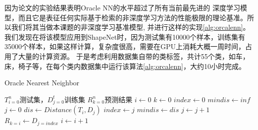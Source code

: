 \documentclass[bachelor, nocolorlinks, printoneside]{seuthesis} %
\begin{document}
\begin{Main}
因为论文\cite{tatarchenko2019single}的实验结果表明Oracle NN的水平超过了所有当前最先进的
深度学习模型，而且它是表征任何实际基于检索的非深度学习方法的性能极限的理论基准。所以我们将其当做本课题的非深度学习基准模型, 并进行这样的实现\ref{alg:orcalenn}。
我们发现在将该模型应用到ShapeNet时，因为测试集有10000个样本，训练集有35000个样本，如果这样计算，复杂度很高，需要在GPU上消耗大概一周时间，占用了大量的计算资源。
于是考虑利用数据集自带的类标签，共计55个类，如车，床，椅子等，在每个类内数据集中运行该算法\ref{alg:orcalenn}，大约10小时完成。

\begin{algorithm}
    \caption{Oracle Nearest Neighbor}
    \label{alg:orcalenn}
    \begin{algorithmic}[1] %
        \Require ${T^{n}_{i=0}}$测试集，${D^{t}_{j=0}}$训练集
        \Ensure ${R^{n}_{k=0}}$预测结果
        \State $i \gets 0$
        \State $k \gets 0$
            \State $index \gets 0$
            \State $mindis \gets inf$
            \State $j \gets 0$
                \State $dis \gets Distance(T_i, D_j)$
                        \State $index \gets j$
                        \State $mindis \gets dis$
                    \EndIf
                \State $j \gets j+1$
            \EndWhile
        \State $R_{k=i} \gets D_{j=index}$
        \State $i \gets i+1$
        \EndWhile
    \end{algorithmic}
\end{algorithm}


\end{Main}
\end{document}
